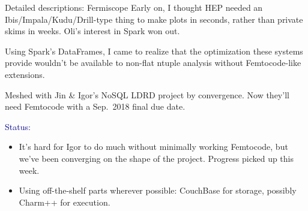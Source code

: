 \documentclass{beamer}
\begin{document}
\begin{frame}{Detailed descriptions: Fermiscope}
\vspace{0.4 cm}
Early on, I thought HEP needed an Ibis/Impala/Kudu/Drill-type thing to make plots in seconds, rather than private skims in weeks. Oli's interest in Spark won out.

\vspace{0.3 cm}
Using Spark's DataFrames, I came to realize that the optimization these systems provide wouldn't be available to non-flat ntuple analysis without Femtocode-like extensions.

\vspace{0.3 cm}
Meshed with Jin \& Igor's NoSQL LDRD project by convergence. Now they'll need Femtocode with a Sep.\ 2018 final due date.

\vspace{0.4 cm}
\textcolor{darkblue}{Status:}
\begin{itemize}
\item It's hard for Igor to do much without minimally working Femtocode, but we've been converging on the shape of the project. Progress picked up this week.
\item Using off-the-shelf parts wherever possible: CouchBase for storage, possibly Charm++ for execution.
\end{itemize}
\end{frame}
\end{document}
